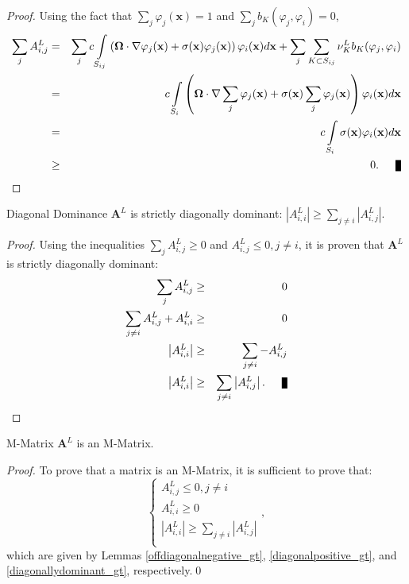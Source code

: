 \begin{proof}
Using the fact that $\sum\limits_j\varphi_j(\mathbf{x})=1$ and
$\sum\limits_j b_K(\varphi_j,\varphi_i)=0$,
\begin{eqnarray*}
	\sum\limits_j A^L_{i,j} & = & \sum\limits_j c\int\limits_{S_{ij}}
      \left(\mathbf{\Omega}\cdot\nabla\varphi_j(\mathbf{x}) +
		\sigma(\mathbf{x})\varphi_j(\mathbf{x})\right)\varphi_i(\mathbf{x}) d\mathbf{x} +
		\sum\limits_j\sum\limits_{K\subset S_{ij}}\nu_K^L b_K(\varphi_j, \varphi_i)\\
		& = & c\int\limits_{S_{i}}\left(\mathbf{\Omega}\cdot
         \nabla\sum\limits_j\varphi_j(\mathbf{x}) +
         \sigma(\mathbf{x})\sum\limits_j\varphi_j(\mathbf{x})\right)
         \varphi_i(\mathbf{x}) d\mathbf{x}\\
		\label{gtrowsum} & = & c\int\limits_{S_{i}}\sigma(\mathbf{x})
         \varphi_i(\mathbf{x}) d\mathbf{x}\\
		&\ge& 0.\qed
\end{eqnarray*}
\end{proof}
\begin{lemma}[label={diagonallydominant_gt}]{Diagonal Dominance}
   $\mathbf{A}^L$ is strictly diagonally dominant:
   $\left|A^L_{i,i}\right| \ge \sum\limits_{j\ne i} \left|A^L_{i,j}\right|$.
\end{lemma}
\begin{proof}
Using the inequalities $\sum\limits_j A^L_{i,j} \ge 0$ and $A^L_{i,j}\le 0, j\ne i$,
it is proven that $\mathbf{A}^L$ is strictly diagonally dominant:
\begin{eqnarray*}
	\sum\limits_j A^L_{i,j} & \ge & 0\\
	\sum\limits_{j\ne i} A^L_{i,j} + A^L_{i,i} & \ge & 0\\
	\left|A^L_{i,i}\right| & \ge & \sum\limits_{j\ne i} -A^L_{i,j}\\
	\left|A^L_{i,i}\right| & \ge & \sum\limits_{j\ne i} \left|A^L_{i,j}\right|.\qed
\end{eqnarray*}
\end{proof}
\begin{lemma}{M-Matrix}
   $\mathbf{A}^L$ is an M-Matrix.
\end{lemma}
\begin{proof}
To prove that a matrix is an M-Matrix, it is sufficient to prove that:
\[
\left\{\begin{array}{l}
A^L_{i,j}\le 0, j\ne i\\
A^L_{i,i}\ge 0\\
\left|A^L_{i,i}\right| \ge \sum\limits_{j\ne i} \left|A^L_{i,j}\right|\\
\end{array}
\right.,
\]
which are given by Lemmas \ref{offdiagonalnegative_gt}, \ref{diagonalpositive_gt}, and
\ref{diagonallydominant_gt}, respectively.\qed
\end{proof}
